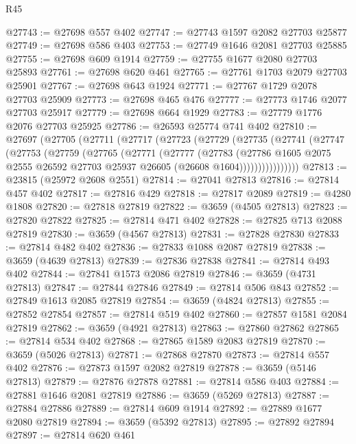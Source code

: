 \begin{lexlean}{R45}
\begin{coremodule}
@27743 := @27698 @557 @402
@27747 := @27743 @1597 @2082 @27703 @25877
@27749 := @27698 @586 @403
@27753 := @27749 @1646 @2081 @27703 @25885
@27755 := @27698 @609 @1914
@27759 := @27755 @1677 @2080 @27703 @25893
@27761 := @27698 @620 @461
@27765 := @27761 @1703 @2079 @27703 @25901
@27767 := @27698 @643 @1924
@27771 := @27767 @1729 @2078 @27703 @25909
@27773 := @27698 @465 @476
@27777 := @27773 @1746 @2077 @27703 @25917
@27779 := @27698 @664 @1929
@27783 := @27779 @1776 @2076 @27703 @25925
@27786 := @26593 @25774 @741 @402
@27810 := @27697
    (@27705
      (@27711
        (@27717
          (@27723
            (@27729
              (@27735
                (@27741
                  (@27747
                    (@27753
                      (@27759
                        (@27765
                          (@27771
                            (@27777
                              (@27783
                                (@27786
                                  @1605
                                  @2075
                                  @2555
                                  @26592
                                  @27703
                                  @25937
                                  @26605
                                  (@26608 @1604))))))))))))))))
@27813 := @23815 (@25972 @2608 @2551)
@27814 := @27041 @27813
@27816 := @27814 @457 @402
@27817 := @27816 @429
@27818 := @27817 @2089
@27819 := @4280 @1808
@27820 := @27818 @27819
@27822 := @3659 (@4505 @27813)
@27823 := @27820 @27822
@27825 := @27814 @471 @402
@27828 := @27825 @713 @2088 @27819
@27830 := @3659 (@4567 @27813)
@27831 := @27828 @27830
@27833 := @27814 @482 @402
@27836 := @27833 @1088 @2087 @27819
@27838 := @3659 (@4639 @27813)
@27839 := @27836 @27838
@27841 := @27814 @493 @402
@27844 := @27841 @1573 @2086 @27819
@27846 := @3659 (@4731 @27813)
@27847 := @27844 @27846
@27849 := @27814 @506 @843
@27852 := @27849 @1613 @2085 @27819
@27854 := @3659 (@4824 @27813)
@27855 := @27852 @27854
@27857 := @27814 @519 @402
@27860 := @27857 @1581 @2084 @27819
@27862 := @3659 (@4921 @27813)
@27863 := @27860 @27862
@27865 := @27814 @534 @402
@27868 := @27865 @1589 @2083 @27819
@27870 := @3659 (@5026 @27813)
@27871 := @27868 @27870
@27873 := @27814 @557 @402
@27876 := @27873 @1597 @2082 @27819
@27878 := @3659 (@5146 @27813)
@27879 := @27876 @27878
@27881 := @27814 @586 @403
@27884 := @27881 @1646 @2081 @27819
@27886 := @3659 (@5269 @27813)
@27887 := @27884 @27886
@27889 := @27814 @609 @1914
@27892 := @27889 @1677 @2080 @27819
@27894 := @3659 (@5392 @27813)
@27895 := @27892 @27894
@27897 := @27814 @620 @461

\end{coremodule}
\end{lexlean}
